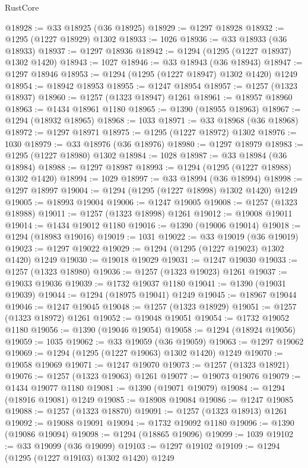 \begin{lexlean}{RustCore}
\begin{coremodule}
@18928 := @33 @18925 (@36 @18925)
@18929 := @1297 @18928
@18932 := @1295 (@1227 @18929) @1302
@18933 := 1026
@18936 := @33 @18933 (@36 @18933)
@18937 := @1297 @18936
@18942 := @1294 (@1295 (@1227 @18937) @1302 @1420)
@18943 := 1027
@18946 := @33 @18943 (@36 @18943)
@18947 := @1297 @18946
@18953 := @1294 (@1295 (@1227 @18947) @1302 @1420) @1249
@18954 := @18942 @18953
@18955 := @1247 @18954
@18957 := @1257 (@1323 @18937)
@18960 := @1257 (@1323 @18947) @1261
@18961 := @18957 @18960
@18963 := @1434 @18961 @1180
@18965 := @1390 (@18955 @18963)
@18967 := @1294 (@18932 @18965)
@18968 := 1033
@18971 := @33 @18968 (@36 @18968)
@18972 := @1297 @18971
@18975 := @1295 (@1227 @18972) @1302
@18976 := 1030
@18979 := @33 @18976 (@36 @18976)
@18980 := @1297 @18979
@18983 := @1295 (@1227 @18980) @1302
@18984 := 1028
@18987 := @33 @18984 (@36 @18984)
@18988 := @1297 @18987
@18993 := @1294 (@1295 (@1227 @18988) @1302 @1420)
@18994 := 1029
@18997 := @33 @18994 (@36 @18994)
@18998 := @1297 @18997
@19004 := @1294 (@1295 (@1227 @18998) @1302 @1420) @1249
@19005 := @18993 @19004
@19006 := @1247 @19005
@19008 := @1257 (@1323 @18988)
@19011 := @1257 (@1323 @18998) @1261
@19012 := @19008 @19011
@19014 := @1434 @19012 @1180
@19016 := @1390 (@19006 @19014)
@19018 := @1294 (@18983 @19016)
@19019 := 1031
@19022 := @33 @19019 (@36 @19019)
@19023 := @1297 @19022
@19029 := @1294 (@1295 (@1227 @19023) @1302 @1420) @1249
@19030 := @19018 @19029
@19031 := @1247 @19030
@19033 := @1257 (@1323 @18980)
@19036 := @1257 (@1323 @19023) @1261
@19037 := @19033 @19036
@19039 := @1732 @19037 @1180
@19041 := @1390 (@19031 @19039)
@19044 := @1294 (@18975 @19041) @1249
@19045 := @18967 @19044
@19046 := @1247 @19045
@19048 := @1257 (@1323 @18929)
@19051 := @1257 (@1323 @18972) @1261
@19052 := @19048 @19051
@19054 := @1732 @19052 @1180
@19056 := @1390 (@19046 @19054)
@19058 := @1294 (@18924 @19056)
@19059 := 1035
@19062 := @33 @19059 (@36 @19059)
@19063 := @1297 @19062
@19069 := @1294 (@1295 (@1227 @19063) @1302 @1420) @1249
@19070 := @19058 @19069
@19071 := @1247 @19070
@19073 := @1257 (@1323 @18921)
@19076 := @1257 (@1323 @19063) @1261
@19077 := @19073 @19076
@19079 := @1434 @19077 @1180
@19081 := @1390 (@19071 @19079)
@19084 := @1294 (@18916 @19081) @1249
@19085 := @18908 @19084
@19086 := @1247 @19085
@19088 := @1257 (@1323 @18870)
@19091 := @1257 (@1323 @18913) @1261
@19092 := @19088 @19091
@19094 := @1732 @19092 @1180
@19096 := @1390 (@19086 @19094)
@19098 := @1294 (@18865 @19096)
@19099 := 1039
@19102 := @33 @19099 (@36 @19099)
@19103 := @1297 @19102
@19109 := @1294 (@1295 (@1227 @19103) @1302 @1420) @1249

\end{coremodule}
\end{lexlean}
